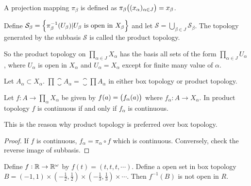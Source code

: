 \begin{definition}
    A projection mapping $\pi_\beta$ is defined as $\pi_\beta \mleft( (x_{\alpha})_{\alpha \in J} \mright) = x_\beta$.
\end{definition}

\begin{definition}
    Define $\mathcal{S}_{\beta} = \set{\pi_{\beta}^{-1}(U_{\beta}) | U_{\beta}\text{ is open in }X_{\beta}}$ and let $\mathcal{S} = \displaystyle \bigcup_{\beta \in J} \mathcal{S}_{\beta}$. The topology generated by the subbasis $\mathcal{S}$ is called the product topology. 
    
    So the product topology on $\displaystyle \prod_{\alpha \in J} X_{\alpha}$ has the basis all sets of the form $\displaystyle \prod_{\alpha \in J} U_{\alpha}$, where $U_{\alpha}$ is open in $X_{\alpha}$ and $U_{\alpha} = X_{\alpha}$ except for finite many value of $\alpha$.
\end{definition}

\begin{theorem}
Let $A_{\alpha} \subset X_{\alpha}$. $\displaystyle \prod \closure{A_{\alpha}} = \closure{\prod A_{\alpha}}$ in either box topology or product topology.
\end{theorem}


\begin{theorem}
Let $\displaystyle f : A \rightarrow \prod_{\alpha} X_{\alpha}$ be given by $f(a) = \mleft( f_{\alpha}(a) \mright)$ where $f_{\alpha} : A \rightarrow X_{\alpha}$. In product topology $f$ is continuous if and only if $f_{\alpha}$ is continuous.

This is the reason why product topology is preferred over box topology.
\end{theorem}
\begin{proof}
    If $f$ is continuous, $f_\alpha = \pi_\alpha \circ f$ which is continuous. Conversely, check the reverse image of subbasis.
\end{proof}

\begin{example}
    Define $f: \mathbb{R} \rightarrow \mathbb{R}^{\omega}$ by $f(t) = (t,t,t, \cdots)$. Define a open set in box topology $B = (-1, 1) \times (- \frac{1}{2}, \frac{1}{2}) \times  (- \frac{1}{3}, \frac{1}{3}) \times \cdots$. Then $f^{-1}(B)$ is not open in $R$.
\end{example}



